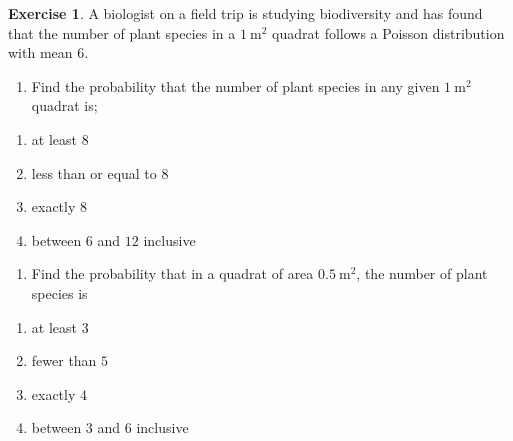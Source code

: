 \documentclass[
]{book}
\providecommand{\tightlist}{%
  \setlength{\itemsep}{0pt}\setlength{\parskip}{0pt}}
\theoremstyle{definition}
\theoremstyle{definition}
\theoremstyle{definition}
\newtheorem{exercise}{Exercise}[chapter]
\theoremstyle{definition}
\theoremstyle{remark}
\begin{document}
\begin{exercise}

A biologist on a field trip is studying biodiversity and has found that the number of plant species in a \(1 \  \text{m}^2\) quadrat follows a Poisson distribution with mean \(6\).

\begin{enumerate}
\def\labelenumi{\alph{enumi})}
\tightlist
\item
  Find the probability that the number of plant species in any given \(1 \  \text{m}^2\) quadrat is;
\end{enumerate}

\begin{enumerate}
\def\labelenumi{(\roman{enumi})}
\item
  at least 8
\item
  less than or equal to \(8\)
\item
  exactly \(8\)
\item
  between \(6\) and \(12\) inclusive
\end{enumerate}

\begin{enumerate}
\def\labelenumi{\alph{enumi})}
\setcounter{enumi}{1}
\tightlist
\item
  Find the probability that in a quadrat of area \(0.5 \  \text{m}^2\), the number of plant species is
\end{enumerate}

\begin{enumerate}
\def\labelenumi{(\roman{enumi})}
\item
  at least \(3\)
\item
  fewer than \(5\)
\item
  exactly \(4\)
\item
  between \(3\) and \(6\) inclusive
\end{enumerate}

\end{exercise}
\end{document}
